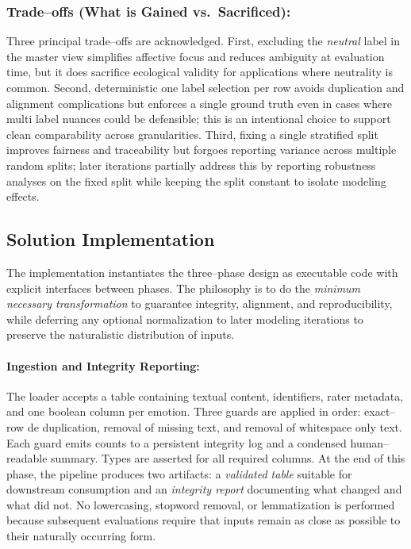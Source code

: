 \subsubsection*{Trade--offs (What is Gained vs.\ Sacrificed):}
Three principal trade--offs are acknowledged. First, excluding the \emph{neutral} label in the master view simplifies affective focus and reduces ambiguity at evaluation time, but it does sacrifice ecological validity for applications where neutrality is common. Second, deterministic one label selection per row avoids duplication and alignment complications but enforces a single ground truth even in cases where multi label nuances could be defensible; this is an intentional choice to support clean comparability across granularities. Third, fixing a single stratified split improves fairness and traceability but forgoes reporting variance across multiple random splits; later iterations partially address this by reporting robustness analyses on the fixed split while keeping the split constant to isolate modeling effects.

\subsection{Solution Implementation}

The implementation instantiates the three--phase design as executable code with explicit interfaces between phases. The philosophy is to do the \emph{minimum necessary transformation} to guarantee integrity, alignment, and reproducibility, while deferring any optional normalization to later modeling iterations to preserve the naturalistic distribution of inputs.

\paragraph{Ingestion and Integrity Reporting:}
The loader accepts a table containing textual content, identifiers, rater metadata, and one boolean column per emotion. Three guards are applied in order: exact--row de duplication, removal of missing text, and removal of whitespace only text. Each guard emits counts to a persistent integrity log and a condensed human--readable summary. Types are asserted for all required columns. At the end of this phase, the pipeline produces two artifacts: a \emph{validated table} suitable for downstream consumption and an \emph{integrity report} documenting what changed and what did not. No lowercasing, stopword removal, or lemmatization is performed because subsequent evaluations require that inputs remain as close as possible to their naturally occurring form.

